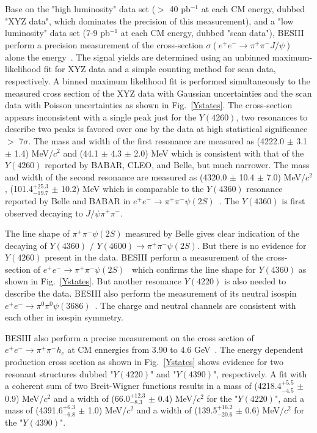 \documentclass{jps-cp}
\begin{document}
Base on the "high luminosity" data set ($>$ 40 pb$^{-1}$ at each CM energy, dubbed "XYZ data", which dominates the precision of this measurement), and a "low luminosity" data set (7-9 pb$^{-1}$ at each CM energy, dubbed "scan data"), BESIII perform a precision measurement of the cross-section $\sigma(e^{+}e^{-}\rightarrow\pi^{+}\pi^{-}J/\psi)$ alone the energy~\cite{pipiJpsiBESIII}. The signal yields are determined using an unbinned maximum-likelihood fit for XYZ data and a simple counting method for scan data, respectively.   A binned maximum likelihood fit is performed simultaneously to the measured cross section of the XYZ data with Gaussian uncertainties and the scan data with Poisson uncertainties as shown in Fig.~\ref{Ystates}. The cross-section appears inconsistent with a single peak just for the $Y(4260)$, two resonances to describe two peaks is favored over one by the data at high statistical significance $>$ 7$\sigma$.  The mass and width of the first resonance are measured as (4222.0 $\pm$ 3.1 $\pm$ 1.4) MeV/$c^{2}$ and (44.1 $\pm$ 4.3 $\pm$ 2.0) MeV which is consistent with that of the $Y(4260)$ reported by BABAR, CLEO, and Belle, but much narrower. The mass and width of the second resonance are measured as (4320.0 $\pm$ 10.4 $\pm$ 7.0) MeV/$c^{2}$,  (101.4$^{+25.3}_{-19.7}$ $\pm$ 10.2) MeV  which is comparable to the $Y(4360)$ resonance reported by Belle and BABAR in $e^{+}e^{-} \rightarrow \pi^{+}\pi^{-}\psi(2S)$~\cite{Y4360Belle,Y4360BABAR}. The $Y(4360)$ is first observed decaying to $J/\psi \pi^{+}\pi^{-}$.

The line shape of $\pi^{+}\pi^{-}\psi(2S)$ measured by Belle gives clear indication of the decaying of $Y(4360)$ $/$ $Y(4600) \rightarrow \pi^{+} \pi^{-} \psi(2S)$. But there is no evidence for $Y(4260)$ present in the data.  BESIII perform a measurement of the cross-section of $e^{+}e^{-}\rightarrow\pi^{+}\pi^{-}\psi(2S)$~\cite{pipipsi3686BESIII} which confirms the line shape for $Y(4360)$ as shown in Fig.~\ref{Ystates}. But another resonance $Y(4220)$ is also needed to describe the data. BESIII also perform the measurement of its neutral isospin $e^{+}e^{-}\rightarrow\pi^{0}\pi^{0}\psi(3686)$~\cite{pi0pi0psi3686BESIII}. The charge and neutral channels are consistent with each other in isospin symmetry.

BESIII also perform a precise  measurement on the cross section of $e^{+}e^{-}\rightarrow\pi^{+}\pi^{-}h_{c}$ at CM ennergies from 3.90 to 4.6 GeV~\cite{pipihcBESIII}. The energy dependent production cross section as shown in Fig.~\ref{Ystates} shows evidence for two resonant structures dubbed "$Y(4220)$" and "$Y(4390)$", respectively. A fit with a coherent sum of two Breit-Wigner functions results in a mass of (4218.4$^{+5.5}_{-4.5}$ $\pm$ 0.9) MeV/$c^{2}$ and a width of (66.0$^{+12.3}_{-8.3}$ $\pm$ 0.4) MeV/$c^{2}$ for the "$Y(4220)$", and a mass of (4391.6$^{+6.3}_{-6.8}$ $\pm$ 1.0) MeV/$c^{2}$ and a width of (139.5$^{+16.2}_{-20.6}$ $\pm$ 0.6) MeV/$c^{2}$ for the "$Y(4390)$".
\end{document}
